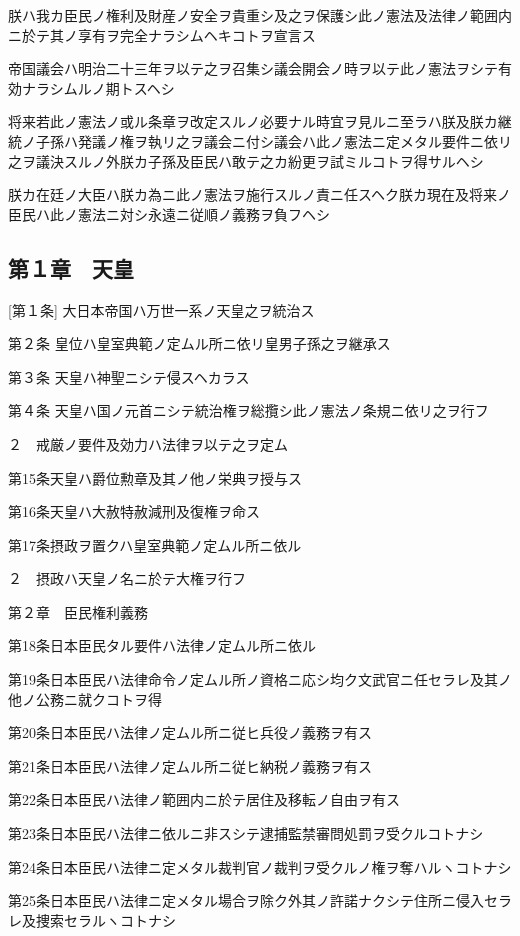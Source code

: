 朕ハ我カ臣民ノ権利及財産ノ安全ヲ貴重シ及之ヲ保護シ此ノ憲法及法律ノ範囲内ニ於テ其ノ享有ヲ完全ナラシムヘキコトヲ宣言ス

帝国議会ハ明治二十三年ヲ以テ之ヲ召集シ議会開会ノ時ヲ以テ此ノ憲法ヲシテ有効ナラシムルノ期トスヘシ

将来若此ノ憲法ノ或ル条章ヲ改定スルノ必要ナル時宜ヲ見ルニ至ラハ朕及朕カ継統ノ子孫ハ発議ノ権ヲ執リ之ヲ議会ニ付シ議会ハ此ノ憲法ニ定メタル要件ニ依リ之ヲ議決スルノ外朕カ子孫及臣民ハ敢テ之カ紛更ヲ試ミルコトヲ得サルヘシ

朕カ在廷ノ大臣ハ朕カ為ニ此ノ憲法ヲ施行スルノ責ニ任スヘク朕カ現在及将来ノ臣民ハ此ノ憲法ニ対シ永遠ニ従順ノ義務ヲ負フヘシ


\subsection*{第１章　天皇}



[第１条] 大日本帝国ハ万世一系ノ天皇之ヲ統治ス



第２条 皇位ハ皇室典範ノ定ムル所ニ依リ皇男子孫之ヲ継承ス

第３条 天皇ハ神聖ニシテ侵スヘカラス

第４条 天皇ハ国ノ元首ニシテ統治権ヲ総攬シ此ノ憲法ノ条規ニ依リ之ヲ行フ

２　戒厳ノ要件及効力ハ法律ヲ以テ之ヲ定ム

第15条天皇ハ爵位勲章及其ノ他ノ栄典ヲ授与ス

第16条天皇ハ大赦特赦減刑及復権ヲ命ス

第17条摂政ヲ置クハ皇室典範ノ定ムル所ニ依ル

２　摂政ハ天皇ノ名ニ於テ大権ヲ行フ

第２章　臣民権利義務

第18条日本臣民タル要件ハ法律ノ定ムル所ニ依ル

第19条日本臣民ハ法律命令ノ定ムル所ノ資格ニ応シ均ク文武官ニ任セラレ及其ノ他ノ公務ニ就クコトヲ得

第20条日本臣民ハ法律ノ定ムル所ニ従ヒ兵役ノ義務ヲ有ス

第21条日本臣民ハ法律ノ定ムル所ニ従ヒ納税ノ義務ヲ有ス

第22条日本臣民ハ法律ノ範囲内ニ於テ居住及移転ノ自由ヲ有ス

第23条日本臣民ハ法律ニ依ルニ非スシテ逮捕監禁審問処罰ヲ受クルコトナシ

第24条日本臣民ハ法律ニ定メタル裁判官ノ裁判ヲ受クルノ権ヲ奪ハルヽコトナシ

第25条日本臣民ハ法律ニ定メタル場合ヲ除ク外其ノ許諾ナクシテ住所ニ侵入セラレ及捜索セラルヽコトナシ

